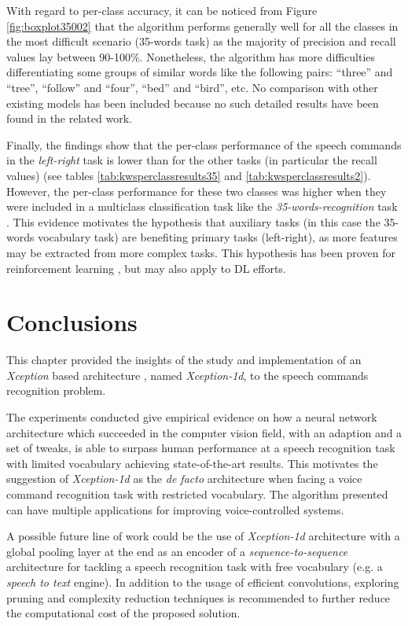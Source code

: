 With regard to per-class accuracy, it can be noticed from Figure \ref{fig:boxplot35002} that the algorithm performs generally well for all the classes in the most difficult scenario (35-words task) as the majority of precision and recall values lay between 90-100\%. Nonetheless, the algorithm has more difficulties differentiating some groups of similar words like the following pairs: ``three'' and ``tree'', ``follow'' and ``four'', ``bed'' and ``bird'', etc. No comparison with other existing models has been included because no such detailed results have been found in the related work.

Finally, the findings show that the per-class performance of the speech commands in the \textit{left-right} task is lower than for the other tasks (in particular the recall values) (see tables \ref{tab:kwsperclassresults35} and \ref{tab:kwsperclassresults2}). However, the per-class performance for these two classes was higher when they were included in a multiclass classification task like the \textit{35-words-recognition} task \autocite{caruana1997}. This evidence motivates the hypothesis that auxiliary tasks (in this case the 35-words vocabulary task) are benefiting primary tasks (left-right), as more features may be extracted from more complex tasks. This hypothesis has been proven for reinforcement learning \autocite{Jaderberg2016}, but may also apply to DL efforts.




\section{Conclusions} \label{sec:conclusion}
This chapter provided the insights of the study and implementation of an \textit{Xception} based architecture \autocite{chollet2017}, named \textit{Xception-1d}, to the speech commands recognition problem.

The experiments conducted give empirical evidence on how a neural network architecture which succeeded in the computer vision field, with an adaption and a set of tweaks, is able to surpass human performance at a speech recognition task with limited vocabulary achieving state-of-the-art results. This motivates the suggestion of \textit{Xception-1d} as the \textit{de facto} architecture when facing a voice command recognition task with restricted vocabulary. The algorithm presented can have multiple  applications for improving voice-controlled systems.

A possible future line of work could be  the use of \textit{Xception-1d} architecture with a global pooling layer at the end  as an encoder of a \textit{sequence-to-sequence} architecture for tackling a speech recognition task with free vocabulary (e.g. a \textit{speech to text} engine). In addition to the usage of efficient convolutions, exploring pruning and complexity reduction techniques is recommended to further reduce the computational cost of the proposed solution.


